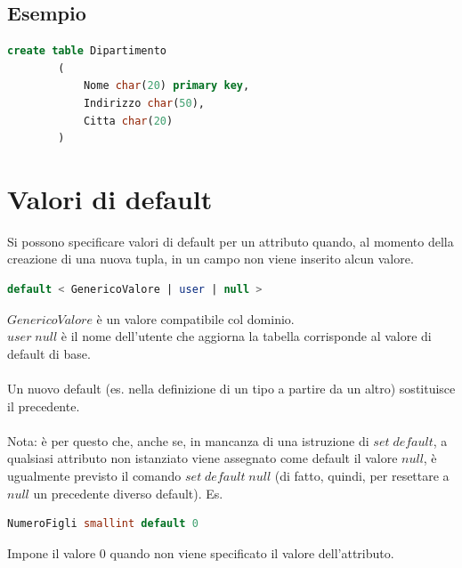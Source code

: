 \documentclass{article}
\begin{document}
	\subsection{Esempio}
	\begin{lstlisting}[language=SQL]
		create table Dipartimento
		(
			Nome char(20) primary key,
			Indirizzo char(50),
			Citta char(20)
		)
	\end{lstlisting}
	\section{Valori di default}
	Si possono specificare valori di default per un attributo quando, al momento della creazione di una nuova tupla, in un campo non viene inserito alcun valore.
	\begin{lstlisting}[language=SQL]
		default < GenericoValore | user | null >
	\end{lstlisting}
	$GenericoValore$ è un valore compatibile col dominio.\\
	$user \; null$ è il nome dell’utente che aggiorna la tabella corrisponde al valore di default di base.\\\\
	Un nuovo default (es. nella definizione di un tipo a partire da un altro) sostituisce il precedente.\\\\
	Nota: è per questo che, anche se, in mancanza di una istruzione di $set \; default$, a qualsiasi attributo non istanziato viene assegnato come default il valore $null$, è ugualmente previsto il comando $set \; default \; null$ (di fatto, quindi, per resettare a $null$ un precedente diverso default).
	Es. 
	\begin{lstlisting}[language=SQL]
		NumeroFigli smallint default 0
	\end{lstlisting}
	Impone il valore 0 quando non viene specificato il valore dell’attributo.
\end{document}

